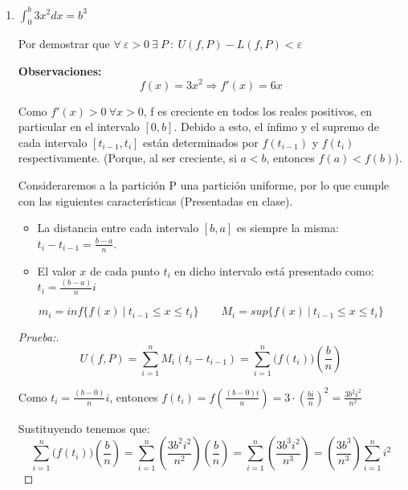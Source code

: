 \documentclass[12pt]{article}
\begin{document}
\begin{enumerate}[\hspace{9px} a)]
\begin{proof}[Prueba:]
            \[sup\{L(f,P)\}=inf\{U(f,P)\}=\frac{b^3}{6}\]

            \textbf{$\therefore \ f$ es integrable en [0,b] y} \(\displaystyle\int_{0}^{b}\frac{x^2}{2}dx=\frac{b^3}{6}\)
        \end{proof}

    \item \(\displaystyle\int_{0}^{b}3x^2dx=b^3\)\medskip

        Por demostrar que \(\forall \ \varepsilon>0 \ \exists \ P \ : \ U(f,P)-L(f,P)<\varepsilon\)\medskip

        \textbf{Observaciones:}
        \[f(x)=3x^2 \Rightarrow f'(x)=6x\]

        Como \(f'(x)>0 \ \forall x>0\), f es creciente en todos los reales positivos, en particular en el intervalo $[0,b]$. Debido a esto, el \'infimo y el supremo de cada intervalo \([t_{i-1},t_i]\) est\'an determinados por \(f(t_{i-1})\) y \(f(t_i)\) respectivamente. (Porque, al ser creciente, si $a<b$, entonces \(f(a)<f(b)\)).\medskip

        Consideraremos a la partici\'on P una partici\'on uniforme, por lo que cumple con las siguientes caracter\'isticas (Presentadas en clase).
        \begin{itemize}
            \item La distancia entre cada intervalo $[b,a]$ es siempre la misma: \(t_i-t_{i-1}=\displaystyle\frac{b-a}{n}\).
            \item El valor $x$ de cada punto $t_i$ en dicho intervalo est\'a presentado como: \(t_i=\displaystyle\frac{(b-a)}{n}i\)
        \end{itemize}

        \[m_i=inf\{f(x) \ | \ t_{i-1} \leq x \leq t_i\} \qquad M_i=sup\{f(x) \ | \ t_{i-1} \leq x \leq t_i\}\]

        \begin{proof}[Prueba:]
            \begin{equation*}%
                U(f,P)=\sum_{i=1}^n M_i(t_i-t_{i-1}) = \sum_{i=1}^n \big(f(t_i)\big)\left(\displaystyle\frac{b}{n}\right)
            \end{equation*}

            Como \(t_i=\displaystyle\frac{(b-0)}{n}i\), entonces \(f(t_i)=f\left(\displaystyle\frac{(b-0)i}{n}\right) = 3\cdot\left(\frac{bi}{n}\right)^2 = \frac{3b^2i^2}{n^2}\)

            Sustituyendo tenemos que:
            \begin{equation*}
                \sum_{i=1}^n \big(f(t_i)\big)\left(\displaystyle\frac{b}{n}\right) = \sum_{i=1}^n \left(\frac{3b^2i^2}{n^2}\right)\left(\displaystyle\frac{b}{n}\right) = \sum_{i=1}^n \left(\frac{3b^3i^2}{n^3}\right) = \left(\frac{3b^3}{n^3}\right) \sum_{i=1}^n i^2
            \end{equation*}


\end{proof}
\end{enumerate}
\end{document}
